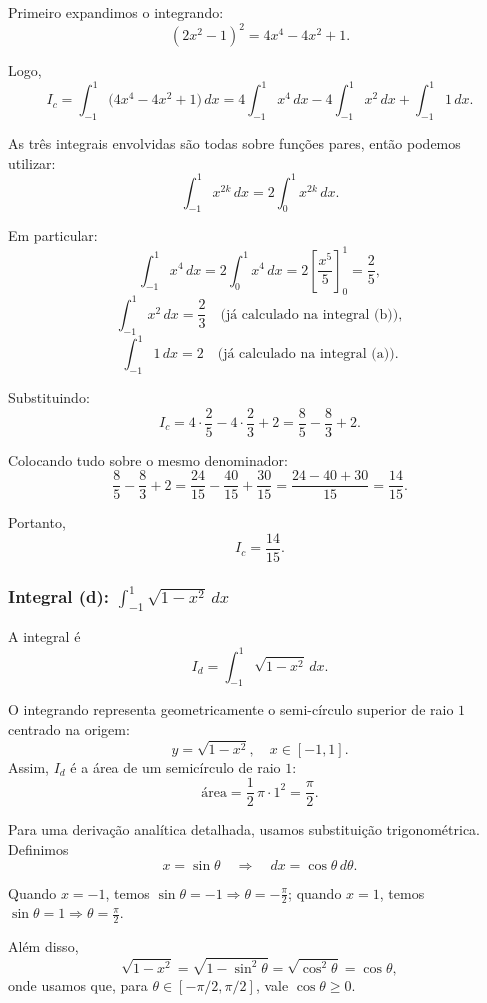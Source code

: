 \documentclass[12pt,a4paper]{article}
\begin{document}
Primeiro expandimos o integrando:
\[
(2x^2 - 1)^2 = 4x^4 - 4x^2 + 1.
\]

Logo,
\[
I_c = \int_{-1}^{1} \bigl(4x^4 - 4x^2 + 1\bigr)\,dx
    = 4 \int_{-1}^{1} x^4\,dx
      - 4 \int_{-1}^{1} x^2\,dx
      + \int_{-1}^{1} 1\,dx.
\]

As três integrais envolvidas são todas sobre funções pares, então podemos utilizar:
\[
\int_{-1}^{1} x^{2k}\,dx = 2 \int_{0}^{1} x^{2k}\,dx.
\]

Em particular:
\[
\int_{-1}^{1} x^4\,dx
= 2 \int_{0}^{1} x^4\,dx
= 2 \left[ \frac{x^5}{5} \right]_{0}^{1}
= \frac{2}{5},
\]
\[
\int_{-1}^{1} x^2\,dx
= \frac{2}{3}
\quad\text{(já calculado na integral (b))},
\]
\[
\int_{-1}^{1} 1\,dx = 2
\quad\text{(já calculado na integral (a))}.
\]

Substituindo:
\[
I_c = 4 \cdot \frac{2}{5}
      - 4 \cdot \frac{2}{3}
      + 2
    = \frac{8}{5}
      - \frac{8}{3}
      + 2.
\]

Colocando tudo sobre o mesmo denominador:
\[
\frac{8}{5} - \frac{8}{3} + 2
= \frac{24}{15} - \frac{40}{15} + \frac{30}{15}
= \frac{24 - 40 + 30}{15}
= \frac{14}{15}.
\]

Portanto,
\[
\boxed{I_c = \dfrac{14}{15}}.
\]

\subsubsection{Integral (d): \texorpdfstring{$\displaystyle \int_{-1}^{1} \sqrt{1 - x^2} \, dx$}{∫\_{-1}^1 sqrt(1−x²) dx}}

A integral é
\[
I_d = \int_{-1}^{1} \sqrt{1 - x^2} \, dx.
\]

O integrando representa geometricamente o semi-círculo superior de raio $1$ centrado na origem:
\[
y = \sqrt{1 - x^2}, \quad x \in [-1,1].
\]
Assim, $I_d$ é a área de um semicírculo de raio $1$:
\[
\text{área} = \frac{1}{2}\,\pi \cdot 1^2 = \frac{\pi}{2}.
\]

Para uma derivação analítica detalhada, usamos substituição trigonométrica.
Definimos
\[
x = \sin\theta \quad\Rightarrow\quad dx = \cos\theta\,d\theta.
\]

Quando $x = -1$, temos $\sin\theta = -1 \Rightarrow \theta = -\frac{\pi}{2}$;  
quando $x = 1$, temos $\sin\theta = 1 \Rightarrow \theta = \frac{\pi}{2}$.

Além disso,
\[
\sqrt{1 - x^2}
= \sqrt{1 - \sin^2\theta}
= \sqrt{\cos^2\theta}
= \cos\theta,
\]
onde usamos que, para $\theta \in [-\pi/2,\pi/2]$, vale $\cos\theta \ge 0$.
\end{document}

